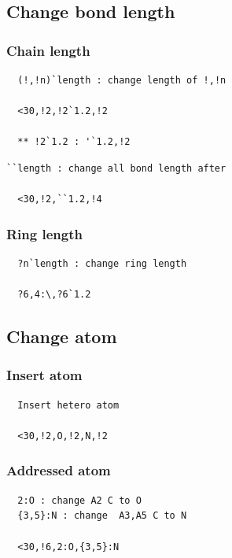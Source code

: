 \documentclass[a4paper]{article}
\makeatletter
\def\MCFstructure{\hspace{5mm}{\@strufont\char\fontnum}\advance\fontnum\@ne\relax}%
\makeatother
\begin{document}
\subsection{Change bond length}
\subsubsection{Chain length}
\begin{verbatim}
  (!,!n)`length : change length of !,!n

  <30,!2,!2`1.2,!2

  ** !2`1.2 : '`1.2,!2
\end{verbatim}
\MCFstructure
\begin{verbatim}
``length : change all bond length after

  <30,!2,``1.2,!4
\end{verbatim}
\MCFstructure
\subsubsection{Ring length}
\begin{verbatim}
  ?n`length : change ring length

  ?6,4:\,?6`1.2
\end{verbatim}
\MCFstructure
\newpage
\subsection{Change atom}
\subsubsection{Insert atom}
\begin{verbatim}
  Insert hetero atom

  <30,!2,O,!2,N,!2
\end{verbatim}
\MCFstructure
\subsubsection{Addressed atom}
\begin{verbatim}
  2:O : change A2 C to O
  {3,5}:N : change  A3,A5 C to N

  <30,!6,2:O,{3,5}:N
\end{verbatim}
\MCFstructure
\end{document}
